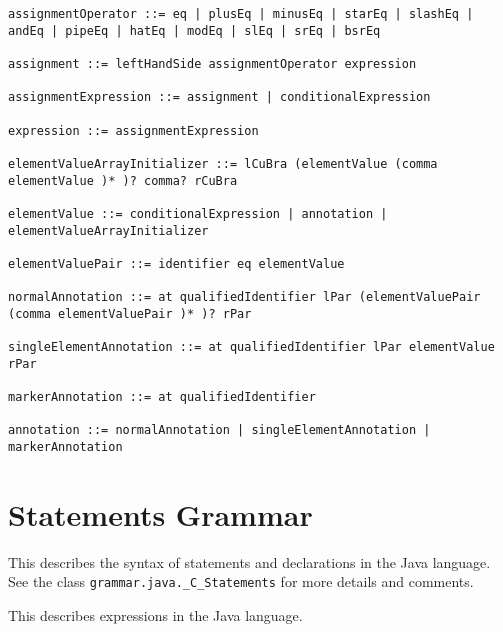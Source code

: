\begin{lstlisting}[breaklines=true]
assignmentOperator ::= eq | plusEq | minusEq | starEq | slashEq | andEq | pipeEq | hatEq | modEq | slEq | srEq | bsrEq

assignment ::= leftHandSide assignmentOperator expression

assignmentExpression ::= assignment | conditionalExpression

expression ::= assignmentExpression

elementValueArrayInitializer ::= lCuBra (elementValue (comma elementValue )* )? comma? rCuBra

elementValue ::= conditionalExpression | annotation | elementValueArrayInitializer

elementValuePair ::= identifier eq elementValue

normalAnnotation ::= at qualifiedIdentifier lPar (elementValuePair (comma elementValuePair )* )? rPar

singleElementAnnotation ::= at qualifiedIdentifier lPar elementValue rPar

markerAnnotation ::= at qualifiedIdentifier

annotation ::= normalAnnotation | singleElementAnnotation | markerAnnotation

\end{lstlisting}


\section{Statements Grammar}
\label{statements_grammar}

This describes the syntax of statements and declarations in the Java
language. See the class \texttt{grammar.java._C_Statements} for more details and
comments.

This describes expressions in the Java language.

\hrulefill

